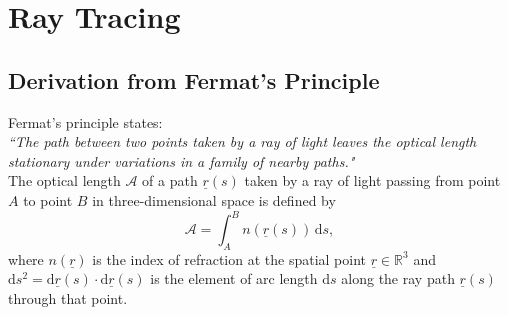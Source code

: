 \documentclass{article}
\begin{document}
\section{Ray Tracing}

\subsection{Derivation from Fermat's Principle}
Fermat's principle states: \\
\textit{``The path between two points taken by a ray of light leaves the optical length stationary under variations in a family of nearby paths."} \\

The optical length $\mathcal{A}$ of a path $\underline{r}(s)$ taken by a ray of light passing from point $A$ to point $B$ in three-dimensional space is defined by
\begin{equation}
	\mathcal{A} = \int_A^B \! n(\underline{r}(s)) \, \mathrm{d}s,
\end{equation}
where $n(\underline{r})$ is the index of refraction at the spatial point $\underline{r} \in \mathbb{R}^3$ and $\mathrm{d}s^2 = \mathrm{d}\underline{r}(s) \cdot \mathrm{d}\underline{r}(s)$ is the element of arc length $\mathrm{d}s$ along the ray path $\underline{r}(s)$ through that point.
\end{document}
